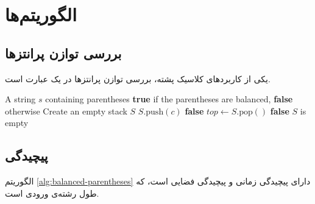 
\section{الگوریتم‌ها}
\label{sec:programming-book-algorithms}

\subsection{بررسی توازن پرانتزها}
\label{sec:programming-book-parentheses}

یکی از کاربردهای کلاسیک پشته، بررسی
توازن پرانتزها در یک عبارت است.

\begin{latin}
\begin{algorithm}
\caption{بررسی توازن پرانتزها}
\label{alg:balanced-parentheses}
\begin{algorithmic}[1]
    \Require A string $s$ containing parentheses
    \Ensure \textbf{true} if the parentheses are balanced,
            \textbf{false} otherwise
    \State Create an empty stack $S$
            \State $S.\text{push}(c)$
                \State \Return \textbf{false}
            \EndIf
            \State $top \gets S.\text{pop}()$
                \State \Return \textbf{false}
            \EndIf
        \EndIf
    \EndFor
    \State \Return $S$ is empty
\end{algorithmic}
\end{algorithm}
\end{latin}


\subsection{پیچیدگی}
\label{sec:programming-book-complexity}

\begin{theorem}
    الگوریتم \cref{alg:balanced-parentheses}
    دارای پیچیدگی زمانی  و
    پیچیدگی فضایی  است، که
     طول رشته‌ی ورودی است.
    \label{thm:balanced-complexity}
\end{theorem}

